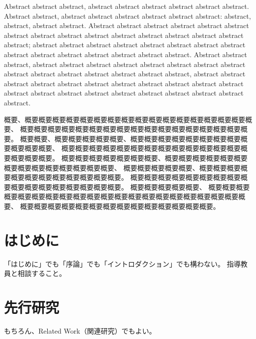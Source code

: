 \documentclass[senior,final,11pt]{iputde-thesis}
\date{February XX, 20XX}
\begin{document}
\begin{eabstract}
Abstract abstract abstract, 
abstract abstract abstract abstract abstract abstract. 
Abstract abstract, abstract abstract abstract abstract abstract abstract: 
abstract, abstract, abstract abstract. 
Abstract abstract abstract abstract abstract abstract abstract 
abstract abstract abstract abstract abstract abstract abstract 
abstract abstract; 
abstract abstract abstract abstract abstract abstract abstract abstract
abstract abstract abstract abstract abstract abstract abstract. 
Abstract abstract abstract, 
abstract abstract abstract abstract abstract abstract abstract abstract
abstract abstract abstract abstract abstract abstract abstract, 
abstract abstract abstract abstract abstract abstract abstract abstract
abstract abstract abstract abstract abstract abstract abstract 
abstract abstract abstract abstract abstract abstract. 
\end{eabstract}
\begin{jabstract}
概要、概要概要概要概要概要概要概要概要概要概要概要概要概要概要概要概要概要、
概要概要概要概要概要概要概要概要概要概要概要概要概要概要概要概要概要。
概要概要、概要概要概要概要概要、概要概要概要概要概要概要概要概要概要概要概要概要、
概要概要概要概要概要概要概要概要概要概要概要概要概要概要概要概要概要。
概要概要概要概要概要概要概要、概要概要概要概要概要概要概要概要概要概要概要概要概要概要、
概要概要概要概要概要、概要概要概要概要概要概要概要概要概要概要概要概要。
概要概要概要概要概要概要概要概要概要概要概要概要概要概要概要概要概要。
概要概要概要概要概要、
概要概要概要概要概要概要概要概要概要概要概要概要概要概要概要概要概要概要概要概要概要、
概要概要概要概要概要概要概要概要概要概要概要概要概要概要。
\end{jabstract}
\maketitle


\frontmatter %
\tableofcontents %
\listoffigures %
\listoftables %

\mainmatter %

\chapter{はじめに}
「はじめに」でも「序論」でも「イントロダクション」でも構わない。
指導教員と相談すること。

\chapter{先行研究}
もちろん、Related Work（関連研究）でもよい。
\end{document}
